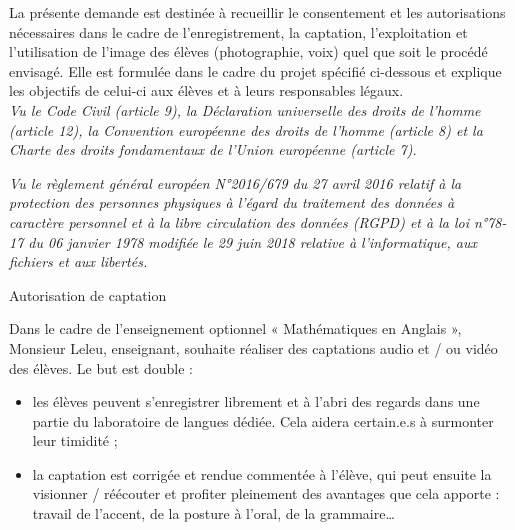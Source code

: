 \documentclass[10pt, a4paper,article]{nsi}
\begin{document}

\scriptsize
La présente demande est destinée à recueillir le consentement et les autorisations nécessaires dans le cadre de l'enregistrement, la captation, l'exploitation et l'utilisation de l'image des élèves (photographie, voix) quel que soit le procédé envisagé. Elle est formulée dans le cadre du projet spécifié ci-dessous et explique les objectifs de celui-ci aux élèves et à leurs responsables légaux.\\

\textit{Vu le Code Civil (article 9), la Déclaration universelle des droits de l'homme (article 12), la Convention européenne des droits de l'homme (article 8) et la Charte des droits fondamentaux de l'Union européenne (article 7).}

\textit{Vu le règlement général européen N°2016/679 du 27 avril 2016 relatif à la protection des personnes physiques à l'égard du traitement des données à caractère personnel et à la libre circulation des données (RGPD) et à la loi n°78-17 du 06 janvier 1978 modifiée le 29 juin 2018 relative à l'informatique, aux fichiers et aux libertés.}\\

\normalsize

\begin{center}
    \Large\color{UGLiBlue}\titlefont Autorisation de captation
\end{center}

Dans le cadre de l'enseignement optionnel « Mathématiques en Anglais », Monsieur Leleu, enseignant, souhaite réaliser des captations audio et / ou vidéo des élèves. Le but est double :
\begin{itemize}
    \item les élèves peuvent s'enregistrer librement et à l'abri des regards dans une partie du laboratoire de langues dédiée. Cela aidera certain.e.s à surmonter leur timidité ;
    \item la captation est corrigée et rendue commentée à l'élève, qui peut ensuite la visionner / réécouter et profiter pleinement des avantages que cela apporte : travail de l'accent, de la posture à l'oral, de la grammaire\ldots
\end{itemize}
\end{document}
